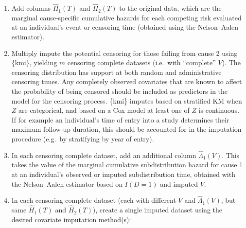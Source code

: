 \documentclass[
  letterpaper,
  DIV=11,
  numbers=noendperiod]{scrreprt}
\begin{document}
\begin{enumerate}
\def\labelenumi{\arabic{enumi}.}
\item
  Add columns \(\hat{H}_1(T)\) and \(\hat{H}_2(T)\) to the original
  data, which are the marginal cause-specific cumulative hazards for
  each competing risk evaluated at an individual's event or censoring
  time (obtained using the Nelson--Aalen estimator).
\item
  Multiply impute the potential censoring for those failing from cause 2
  using \{kmi\}, yielding \(m\) censoring complete datasets (i.e.~with
  ``complete'' \(V\)). The censoring distribution has support at both
  random and administrative censoring times. Any completely observed
  covariates that are known to affect the probability of being censored
  should be included as predictors in the model for the censoring
  process. \{kmi\} imputes based on stratified KM when \(Z\) are
  categorical, and based on a Cox model at least one of \(Z\) is
  continuous. If for example an individual's time of entry into a study
  determines their maximum follow-up duration, this should be accounted
  for in the imputation procedure (e.g.~by stratifying by year of
  entry).
\item
  In each censoring complete dataset, add an additional column
  \(\hat{\Lambda}_1(V)\). This takes the value of the marginal
  cumulative subdistribution hazard for cause 1 at an individual's
  observed or imputed subdistribution time, obtained with the
  Nelson--Aalen estimator based on \(I(D = 1)\) and imputed \(V\).
\item
  In each censoring complete dataset (each with different \(V\) and
  \(\hat{\Lambda}_1(V)\), but same \(\hat{H}_1(T)\) and
  \(\hat{H}_2(T)\)), create a single imputed dataset using the desired
  covariate imputation method(s):


\end{enumerate}
\end{document}
